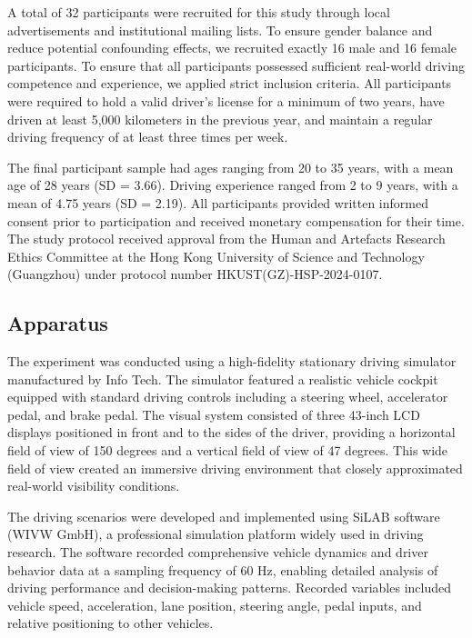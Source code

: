 \documentclass[manuscript,review]{acmart}
\begin{document}
A total of 32 participants were recruited for this study through local advertisements and institutional mailing lists. To ensure gender balance and reduce potential confounding effects, we recruited exactly 16 male and 16 female participants. To ensure that all participants possessed sufficient real-world driving competence and experience, we applied strict inclusion criteria. All participants were required to hold a valid driver's license for a minimum of two years, have driven at least 5,000 kilometers in the previous year, and maintain a regular driving frequency of at least three times per week.

The final participant sample had ages ranging from 20 to 35 years, with a mean age of 28 years (SD = 3.66). Driving experience ranged from 2 to 9 years, with a mean of 4.75 years (SD = 2.19). All participants provided written informed consent prior to participation and received monetary compensation for their time. The study protocol received approval from the Human and Artefacts Research Ethics Committee at the Hong Kong University of Science and Technology (Guangzhou) under protocol number HKUST(GZ)-HSP-2024-0107.

\subsection{Apparatus}

The experiment was conducted using a high-fidelity stationary driving simulator manufactured by Info Tech. The simulator featured a realistic vehicle cockpit equipped with standard driving controls including a steering wheel, accelerator pedal, and brake pedal. The visual system consisted of three 43-inch LCD displays positioned in front and to the sides of the driver, providing a horizontal field of view of 150 degrees and a vertical field of view of 47 degrees. This wide field of view created an immersive driving environment that closely approximated real-world visibility conditions.

The driving scenarios were developed and implemented using SiLAB software (WIVW GmbH), a professional simulation platform widely used in driving research. The software recorded comprehensive vehicle dynamics and driver behavior data at a sampling frequency of 60 Hz, enabling detailed analysis of driving performance and decision-making patterns. Recorded variables included vehicle speed, acceleration, lane position, steering angle, pedal inputs, and relative positioning to other vehicles.
\end{document}
